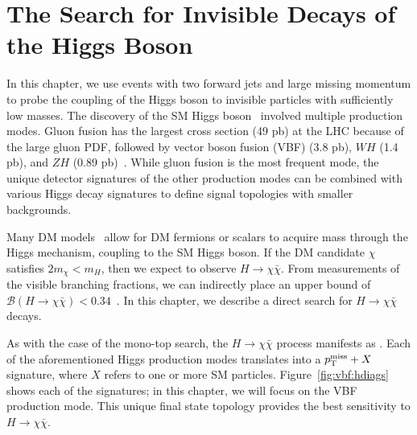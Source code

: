 \chapter{The Search for Invisible Decays of the Higgs Boson}
\label{sec:vbf}

In this chapter, we use events with two forward jets and large missing momentum to probe the coupling of the Higgs boson to invisible particles with sufficiently low masses. 
The discovery of the SM Higgs boson~\cite{higgsdisc} involved multiple production modes.
Gluon fusion has the largest cross section (49 pb) at the LHC because of the large gluon PDF, followed by vector boson fusion (VBF) (3.8 pb), $WH$ (1.4 pb), and $ZH$ (0.89 pb)~\cite{lhchxswg}.
While gluon fusion is the most frequent mode, the unique detector signatures of the other production modes can be combined with various Higgs decay signatures to define signal topologies with smaller backgrounds.

Many DM models~\cite{higgsdm1,higgsdm2,higgsdm3} allow for DM fermions or scalars to acquire mass through the Higgs mechanism, coupling to the SM Higgs boson.
If the DM candidate $\chi$ satisfies $2m_\chi < m_H$, then we expect to observe $H\rightarrow\chi\bar\chi$.
From measurements of the visible branching fractions, we can indirectly place an upper bound of $\mathcal{B}(H\rightarrow\chi\bar\chi)<0.34$~\cite{higgscomb}.
In this chapter, we describe a direct search for $H\rightarrow\chi\bar\chi$ decays.

As with the case of the mono-top search, the $H\rightarrow\chi\bar\chi$ process manifests as \ptmiss. 
Each of the aforementioned Higgs production modes translates into a $p_\mathrm{T}^\mathrm{miss}+X$ signature, where $X$ refers to one or more SM particles.
Figure~\ref{fig:vbf:hdiags} shows each of the signatures; in this chapter, we will focus on the VBF production mode.
This unique final state topology provides the best sensitivity to $H\rightarrow\chi\bar\chi$.

